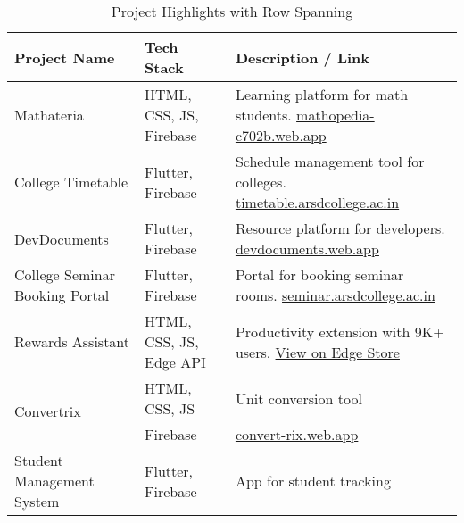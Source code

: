 \documentclass[12pt, a4paper]{article}
\begin{document}
\begin{table}[h]
    \centering
    \begin{tabularx}{\textwidth}{|X|l|X|}
        \hline
        \textbf{Project Name} & \textbf{Tech Stack} & \textbf{Description / Link} \\
        \hline
        Mathateria & HTML, CSS, JS, Firebase & Learning platform for math students. \href{https://mathopedia-c702b.web.app/}{mathopedia-c702b.web.app} \\
        \hline
        College Timetable & Flutter, Firebase & Schedule management tool for colleges. \href{https://timetable.arsdcollege.ac.in/}{timetable.arsdcollege.ac.in} \\
        \hline
        DevDocuments & Flutter, Firebase & Resource platform for developers. \href{https://devdocuments.web.app/}{devdocuments.web.app} \\
        \hline
        College Seminar Booking Portal & Flutter, Firebase & Portal for booking seminar rooms. \href{https://seminar.arsdcollege.ac.in/}{seminar.arsdcollege.ac.in} \\
        \hline
        Rewards Assistant & HTML, CSS, JS, Edge API & Productivity extension with 9K+ users. \href{https://edge-stats.com/d/kkpjhahghfmbiibocfblallmginjfbpb}{View on Edge Store} \\
        \hline
        \multirow{2}{*}{Convertrix} & HTML, CSS, JS & Unit conversion tool \\
                                    & Firebase & \href{https://convert-rix.web.app/}{convert-rix.web.app} \\
        \hline
        Student Management System & Flutter, Firebase & App for student tracking \\
        \hline
    \end{tabularx}
    \caption{Project Highlights with Row Spanning}
    \label{tab:projects}
\end{table}
\end{document}

